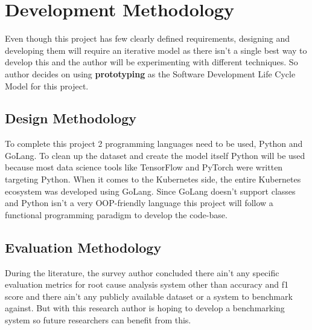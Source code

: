 {\let\clearpage\relax \chapter{Development Methodology}}

Even though this project has few clearly defined requirements, designing and developing them will require an iterative model as there isn't a single best way to develop this and the author will be experimenting with different techniques. So author decides on using \textbf{prototyping} as the Software Development Life Cycle Model for this project.

\section{Design Methodology}

To complete this project 2 programming languages need to be used, Python and GoLang. To clean up the dataset and create the model itself Python will be used because most data science tools like TensorFlow and PyTorch were written targeting Python. When it comes to the Kubernetes side, the entire Kubernetes ecosystem was developed using GoLang. Since GoLang doesn't support classes and Python isn't a very OOP-friendly language this project will follow a functional programming paradigm to develop the code-base. 

\section{Evaluation Methodology}

During the literature, the survey author concluded there ain't any specific evaluation metrics for root cause analysis system other than accuracy and f1 score and there ain't any publicly available dataset or a system to benchmark against. But with this research author is hoping to develop a benchmarking system so future researchers can benefit from this.